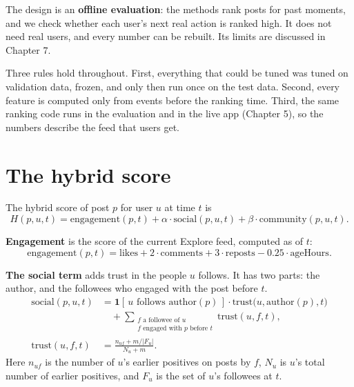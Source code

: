 The design is an \textbf{offline evaluation}: the methods rank posts for past moments, and we check whether each user's next real action is ranked high. It does not need real users, and every number can be rebuilt. Its limits are discussed in Chapter 7.

Three rules hold throughout. First, everything that could be tuned was tuned on validation data, frozen, and only then run once on the test data. Second, every feature is computed only from events before the ranking time. Third, the same ranking code runs in the evaluation and in the live app (Chapter 5), so the numbers describe the feed that users get.

\section{The hybrid score}
\label{sec:method-hybrid}

The hybrid score of post $p$ for user $u$ at time $t$ is
\begin{equation}
  H(p,u,t) = \text{engagement}(p,t) + \alpha \cdot \text{social}(p,u,t) + \beta \cdot \text{community}(p,u,t).
  \label{eq:method-hybrid}
\end{equation}

\textbf{Engagement} is the score of the current Explore feed, computed as of $t$:
\begin{equation}
  \text{engagement}(p,t) = \text{likes} + 2 \cdot \text{comments} + 3 \cdot \text{reposts} - 0.25 \cdot \text{ageHours}.
  \label{eq:method-engagement}
\end{equation}

\textbf{The social term} adds trust in the people $u$ follows. It has two parts: the author, and the followees who engaged with the post before $t$.
\begin{align}
  \text{social}(p,u,t) &= \mathbf{1}[\,u \text{ follows } \text{author}(p)\,] \cdot \text{trust}\bigl(u,\text{author}(p),t\bigr) \nonumber\\
  &\quad + \sum_{\substack{f \text{ a followee of } u\\ f \text{ engaged with } p \text{ before } t}} \text{trust}(u,f,t), \label{eq:method-social}\\[4pt]
  \text{trust}(u,f,t) &= \frac{n_{uf} + m/|F_u|}{N_u + m}. \label{eq:method-trust}
\end{align}
\noindent Here $n_{uf}$ is the number of $u$'s earlier positives on posts by $f$, $N_u$ is $u$'s total number of earlier positives, and $F_u$ is the set of $u$'s followees at $t$.

